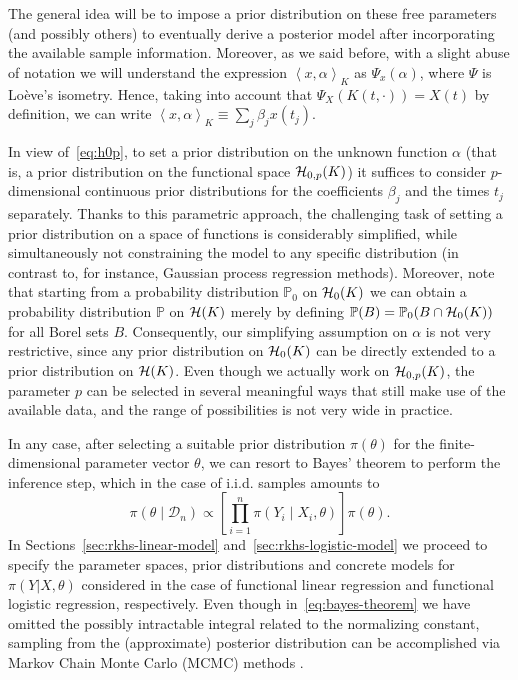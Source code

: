 \documentclass[ba]{imsart}
\numberwithin{equation}{section}
\theoremstyle{plain}
\newcommand{\Hcal}{\ensuremath\mathcal{H}}
\newcommand\dotprod[2]{\left\langle #1, #2 \right\rangle}
\begin{document}
The general idea will be to impose a prior distribution on these free parameters (and possibly others) to eventually derive a posterior model after incorporating the available sample information.  Moreover, as we said before, with a slight abuse of notation we will understand the expression \(\dotprod{x}{\alpha}_K\) as \(\Psi_x(\alpha)\), where \(\Psi\) is Loève's isometry. Hence, taking into account that \(\Psi_X(K(t, \cdot)) = X(t)\) by definition, we can write \(\dotprod{x}{\alpha}_K \equiv \sum_j \beta_j x(t_j)\).

In view of~\eqref{eq:h0p}, to set a prior distribution on the unknown function \(\alpha\) (that is, a prior distribution on the functional space \(\Hcal_{0,p}(K)\)) it suffices to consider \(p\)-dimensional continuous prior distributions for the coefficients \(\beta_j\) and the times \(t_j\) separately. Thanks to this parametric approach, the challenging task of setting a prior distribution on a space of functions is considerably simplified, while simultaneously not constraining the model to any specific distribution (in contrast to, for instance, Gaussian process regression methods). Moreover, note that starting from a probability distribution \(\mathbb{P}_0\) on \(\Hcal_0(K)\) we can obtain a probability distribution \(\mathbb{P}\) on \(\Hcal(K)\) merely by defining \(\mathbb{P}(B) = \mathbb{P}_0(B\cap \Hcal_0(K))\) for all Borel sets \(B\). Consequently, our simplifying assumption on \(\alpha\) is not very restrictive, since any prior distribution on \(\Hcal_0(K)\) can be directly extended to a prior distribution on \(\Hcal(K)\). Even though we actually work on \(\Hcal_{0,p}(K)\), the parameter \(p\) can be selected in several meaningful ways that still make use of the available data, and the range of possibilities is not very wide in practice.

In any case, after selecting a suitable prior distribution \(\pi(\theta)\) for the finite-dimensional parameter vector \(\theta\), we can resort to Bayes' theorem to perform the inference step, which in the case of i.i.d. samples amounts to
\begin{equation}\label{eq:bayes-theorem}
  \pi(\theta \mid \mathcal D_n) \propto \left[ \prod_{i=1}^n \pi(Y_i\mid X_i, \theta) \right]\pi(\theta).
\end{equation}
In Sections~\ref{sec:rkhs-linear-model} and~\ref{sec:rkhs-logistic-model} we proceed to specify the parameter spaces, prior distributions and concrete models for \(\pi(Y | X,\theta)\) considered in the case of functional linear regression and functional logistic regression, respectively. Even though in~\eqref{eq:bayes-theorem} we have omitted the possibly intractable integral related to the normalizing constant, sampling from the (approximate) posterior distribution can be accomplished via Markov Chain Monte Carlo (MCMC) methods \citep[e.g.][]{brooks2011handbook}.
\end{document}
